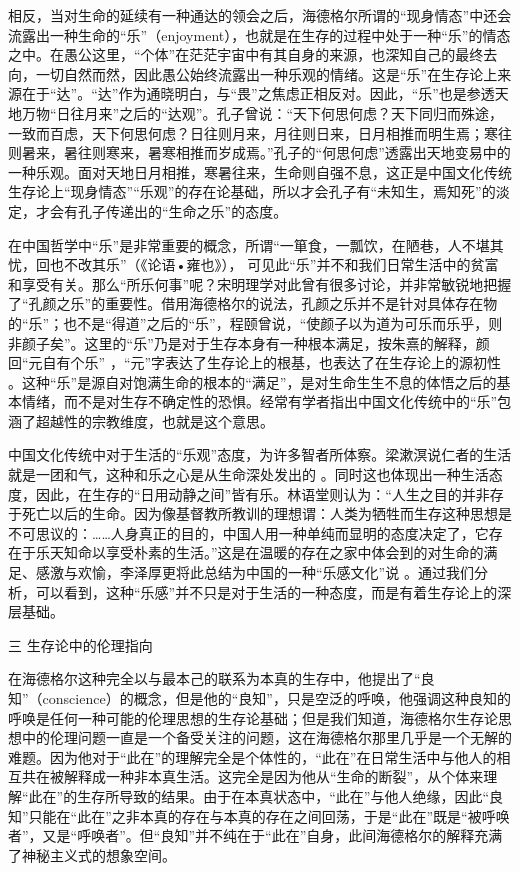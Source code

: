 \documentclass[UTF8, 12pt, a4paper]{ctexrep}
\begin{document}
相反，当对生命的延续有一种通达的领会之后，海德格尔所谓的“现身情态”中还会流露出一种生命的“乐”（enjoyment），也就是在生存的过程中处于一种“乐”的情态之中。在愚公这里，“个体”在茫茫宇宙中有其自身的来源，也深知自己的最终去向，一切自然而然，因此愚公始终流露出一种乐观的情绪。这是“乐”在生存论上来源在于“达”。“达”作为通晓明白，与“畏”之焦虑正相反对。因此，“乐”也是参透天地万物“日往月来”之后的“达观”。孔子曾说：“天下何思何虑？天下同归而殊途，一致而百虑，天下何思何虑？日往则月来，月往则日来，日月相推而明生焉；寒往则暑来，暑往则寒来，暑寒相推而岁成焉。”孔子的“何思何虑”透露出天地变易中的一种乐观。面对天地日月相推，寒暑往来，生命则自强不息，这正是中国文化传统生存论上“现身情态”“乐观”的存在论基础，所以才会孔子有“未知生，焉知死”的淡定，才会有孔子传递出的“生命之乐”的态度。

在中国哲学中“乐”是非常重要的概念，所谓“一箪食，一瓢饮，在陋巷，人不堪其忧，回也不改其乐”（《论语•雍也》）， 可见此“乐”并不和我们日常生活中的贫富和享受有关。那么“所乐何事”呢？宋明理学对此曾有很多讨论，并非常敏锐地把握了“孔颜之乐”的重要性。借用海德格尔的说法，孔颜之乐并不是针对具体存在物的“乐”；也不是“得道”之后的“乐”，程颐曾说，“使颜子以为道为可乐而乐乎，则非颜子矣”。这里的“乐”乃是对于生存本身有一种根本满足，按朱熹的解释，颜回“元自有个乐” ，“元”字表达了生存论上的根基，也表达了在生存论上的源初性 。这种“乐”是源自对饱满生命的根本的“满足”，是对生命生生不息的体悟之后的基本情绪，而不是对生存不确定性的恐惧。经常有学者指出中国文化传统中的“乐”包涵了超越性的宗教维度，也就是这个意思。

中国文化传统中对于生活的“乐观”态度，为许多智者所体察。梁漱溟说仁者的生活就是一团和气，这种和乐之心是从生命深处发出的 。同时这也体现出一种生活态度，因此，在生存的“日用动静之间”皆有乐。林语堂则认为：“人生之目的并非存于死亡以后的生命。因为像基督教所教训的理想谓：人类为牺牲而生存这种思想是不可思议的：……人身真正的目的，中国人用一种单纯而显明的态度决定了，它存在于乐天知命以享受朴素的生活。”这是在温暖的存在之家中体会到的对生命的满足、感激与欢愉，李泽厚更将此总结为中国的一种“乐感文化”说 。通过我们分析，可以看到，这种“乐感”并不只是对于生活的一种态度，而是有着生存论上的深层基础。

三  生存论中的伦理指向

在海德格尔这种完全以与最本己的联系为本真的生存中，他提出了“良知”（conscience）的概念，但是他的“良知”，只是空泛的呼唤，他强调这种良知的呼唤是任何一种可能的伦理思想的生存论基础；但是我们知道，海德格尔生存论思想中的伦理问题一直是一个备受关注的问题，这在海德格尔那里几乎是一个无解的难题。因为他对于“此在”的理解完全是个体性的，“此在”在日常生活中与他人的相互共在被解释成一种非本真生活。这完全是因为他从“生命的断裂”，从个体来理解“此在”的生存所导致的结果。由于在本真状态中，“此在”与他人绝缘，因此“良知”只能在“此在”之非本真的存在与本真的存在之间回荡，于是“此在”既是“被呼唤者”，又是“呼唤者”。但“良知”并不纯在于“此在”自身，此间海德格尔的解释充满了神秘主义式的想象空间。
\end{document}
